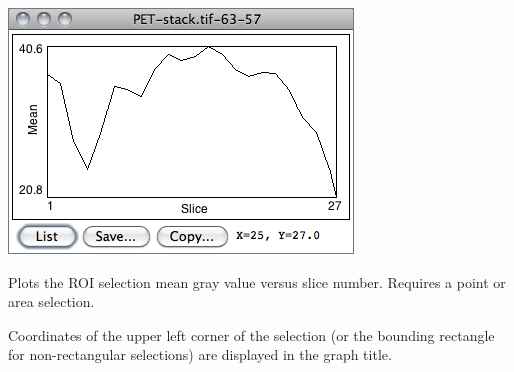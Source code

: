 \subsubsection{\protect{}\label{sub:Plot-Z-axis-Profile...}}

\begin{minipage}[c][1\totalheight][t]{0.48\columnwidth}%
\includegraphics[scale=0.55]{images/Zprofile}%
\end{minipage}%
\begin{minipage}[c][1\totalheight][t]{0.52\columnwidth}%
Plots the ROI selection mean gray value versus slice number. Requires
a point or area selection.\medskip{}


Coordinates of the upper left corner of the selection (or the bounding
rectangle for non-rectangular selections) are displayed in the graph
title.


%
\end{minipage}


\subsubsection[\protect\userinterface{Label\ldots{}}]{\protect{}\label{sub:Label...}\improvement{}}

